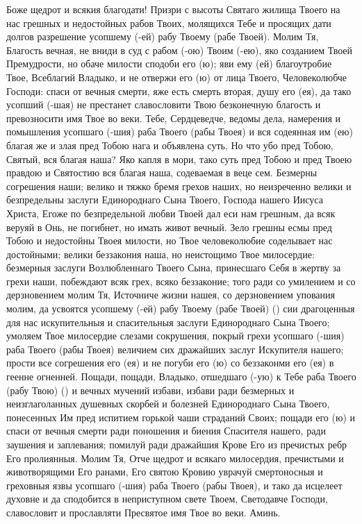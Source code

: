 \mychapterending

\begin{mymulticols}
 

Боже щедрот и всякия благодати! Призри с высоты Святаго жилища Твоего на нас грешных и недостойных рабов Твоих, молящихся Тебе и просящих дати долгов разрешение усопшему (-ей) рабу Твоему (рабе Твоей). Молим Тя, Благость вечная, не вниди в суд с рабом (-ою) Твоим (-ею), яко созданием Твоей Премудрости, но обаче милости сподоби его (ю); яви ему (ей) благоутробие Твое, Всеблагий Владыко, и не отвержи его (ю) от лица Твоего, Человеколюбче Господи: спаси от вечныя смерти, яже есть смерть вторая, душу его (ея), да тако усопший (-шая) не престанет славословити Твою безконечную благость и превозносити имя Твое во веки. Тебе, Сердцеведче, ведомы дела, намерения и помышления усопшаго (-шия) раба Твоего (рабы Твоея) и вся содеянная им (ею) благая же и злая пред Тобою нага и объявлена суть. Но что убо пред Тобою, Святый, вся благая наша? Яко капля в мори, тако суть пред Тобою и пред Твоею правдою и Святостию вся благая наша, содеваемая в веце сем. Безмерны согрешения наши; велико и тяжко бремя грехов наших, но неизреченно велики и безпредельны заслуги Единороднаго Сына Твоего, Господа нашего Иисуса Христа, Егоже по безпредельной любви Твоей дал еси нам грешным, да всяк веруяй в Онь, не погибнет, но имать живот вечный. Зело грешны есмы пред Тобою и недостойны Твоея милости, но Твое человеколюбие соделывает нас достойными; велики беззакония наша, но неистощимо Твое милосердие: безмерныя заслуги Возлюбленнаго Твоего Сына, принесшаго Себя в жертву за грехи наши, побеждают всяк грех, всяко беззаконие; того ради со умилением и со дерзновением молим Тя, Источниче жизни нашея, со дерзновением упования молим, да усвоятся усопшему (-ей) рабу Твоему (рабе Твоей) () сии драгоценныя для нас искупительныя и спасительныя заслуги Единороднаго Сына Твоего; умоляем Твое милосердие слезами сокрушения, покрый грехи усопшаго (-шия) раба Твоего (рабы Твоея) величием сих дражайших заслуг Искупителя нашего; прости все согрешения его (ея) и не погуби его (ю) со беззаконми его (ея) в геенне огненней. Пощади, пощади, Владыко, отшедшаго (-ую) к Тебе раба Твоего (рабу Твою) () и вечных мучений избави, избави ради безмерных и неизглаголанных душевных скорбей и болезней Единороднаго Сына Твоего, понесенных Им пред испитием горькой чаши страданий Своих; пощади его (ю) и спаси от вечныя смерти ради поношения и биения Спасителя нашего, ради заушения и заплевания; помилуй ради дражайшия Крове Его из пречистых ребр Его пролиянныя. Молим Тя, Отче щедрот и всякаго милосердия, пречистыми и животворящими Его ранами, Его святою Кровию уврачуй смертоносныя и греховныя язвы усопшаго (-шия) раба Твоего (рабы Твоея), и тако да исцелеет духовне и да сподобится в неприступном свете Твоем, Светодавче Господи, славословит и прославляти Пресвятое имя Твое во веки. Аминь. 

\end{mymulticols}


